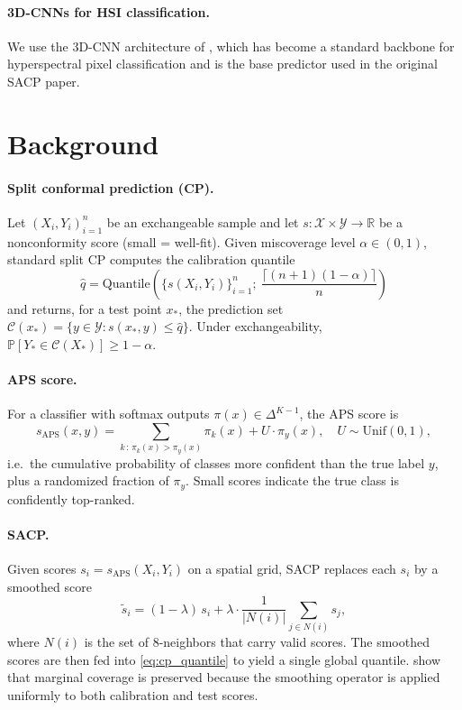 \documentclass[11pt]{article}
\newcommand{\R}{\mathbb{R}}
\newcommand{\1}{\mathbf{1}}
\newcommand{\Prob}{\mathbb{P}}
\begin{document}
\paragraph{3D-CNNs for HSI classification.} We use the 3D-CNN architecture of \citet{hamida20183dcnn}, which has become a standard backbone for hyperspectral pixel classification and is the base predictor used in the original SACP paper.

\section{Background}
\label{sec:background}

\paragraph{Split conformal prediction (CP).} Let $(X_i, Y_i)_{i=1}^n$ be an exchangeable sample and let $s : \mathcal{X} \times \mathcal{Y} \to \R$ be a nonconformity score (small = well-fit). Given miscoverage level $\alpha \in (0,1)$, standard split CP computes the calibration quantile
\begin{equation}
    \hat{q} = \text{Quantile}\left(\{s(X_i, Y_i)\}_{i=1}^n;\ \frac{\lceil (n+1)(1-\alpha)\rceil}{n}\right)
    \label{eq:cp_quantile}
\end{equation}
and returns, for a test point $x_\ast$, the prediction set $\mathcal{C}(x_\ast) = \{y \in \mathcal{Y} : s(x_\ast, y) \le \hat{q}\}$. Under exchangeability, $\Prob[Y_\ast \in \mathcal{C}(X_\ast)] \ge 1 - \alpha$.

\paragraph{APS score.} For a classifier with softmax outputs $\pi(x) \in \Delta^{K-1}$, the APS score \citep{romano2020classification} is
\begin{equation}
    s_{\text{APS}}(x, y) = \sum_{k\,:\,\pi_k(x) > \pi_y(x)} \pi_k(x) + U\cdot\pi_y(x), \quad U \sim \mathrm{Unif}(0,1),
    \label{eq:aps}
\end{equation}
i.e.\ the cumulative probability of classes more confident than the true label $y$, plus a randomized fraction of $\pi_y$. Small scores indicate the true class is confidently top-ranked.

\paragraph{SACP.} Given scores $s_i = s_{\text{APS}}(X_i, Y_i)$ on a spatial grid, SACP \citep{liu2024sacp} replaces each $s_i$ by a smoothed score
\begin{equation}
    \tilde{s}_i = (1 - \lambda)\, s_i + \lambda \cdot \frac{1}{|N(i)|}\sum_{j \in N(i)} s_j,
    \label{eq:sacp_smooth}
\end{equation}
where $N(i)$ is the set of 8-neighbors that carry valid scores. The smoothed scores are then fed into \eqref{eq:cp_quantile} to yield a single global quantile. \citet{liu2024sacp} show that marginal coverage is preserved because the smoothing operator is applied uniformly to both calibration and test scores.
\end{document}
